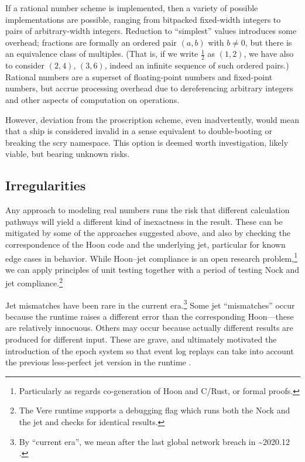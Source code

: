 \documentclass[twoside]{article}
\begin{document}
If a rational number scheme is implemented, then a variety of possible implementations are possible, ranging from bitpacked fixed-width integers to pairs of arbitrary-width integers.  Reduction to “simplest” values introduces some overhead; fractions are formally an ordered pair $(a, b)$ with $b \neq 0$, but there is an equivalence class of multiples.  (That is, if we write $\frac{1}{2}$ as $(1, 2)$, we have also to consider $(2, 4)$, $(3, 6)$, indeed an infinite sequence of such ordered pairs.)  Rational numbers are a superset of floating-point numbers and fixed-point numbers, but accrue processing overhead due to dereferencing arbitrary integers and other aspects of computation on operations.

However, deviation from the proscription scheme, even inadvertently, would mean that a ship is considered invalid in a sense equivalent to double-booting or breaking the scry namespace.  This option is deemed worth investigation, likely viable, but bearing unknown risks.


\subsection{Irregularities}

Any approach to modeling real numbers runs the risk that different calculation pathways will yield a different kind of inexactness in the result.  These can be mitigated by some of the approaches suggested above, and also by checking the correspondence of the Hoon code and the underlying jet, particular for known edge cases in behavior.  While Hoon–jet compliance is an open research problem,\footnote{Particularly as regards co-generation of Hoon and C/Rust, or formal proofs.} we can apply principles of unit testing together with a period of testing Nock and jet compliance.\footnote{The Vere runtime supports a debugging flag which runs both the Nock and the jet and checks for identical results.}

Jet mismatches have been rare in the current era.\footnote{By “current era”, we mean after the last global network breach in \textasciitilde 2020.12 \citep{UrbitBreach}.}  Some jet “mismatches” occur because the runtime raises a different error than the corresponding Hoon—these are relatively innocuous.  Others may occur because actually different results are produced for different input.  These are grave, and ultimately motivated the introduction of the epoch system so that event log replays can take into account the previous less-perfect jet version in the runtime \citep{UrbitEpoch}.
\end{document}
